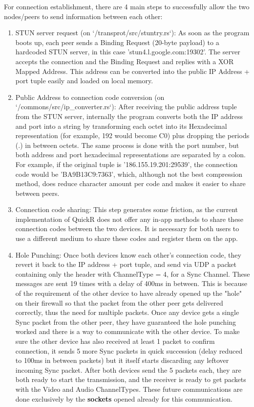 \documentclass{article}
\begin{document}
For connection establishment, there are 4 main steps to successfully allow the two nodes/peers to send information between each other:
\begin{enumerate}
    \item STUN server request (on \colorbox{gray!20}{`/transprot/src/stuntry.rs`}): As soon as the program boots up, each peer sends a Binding Request (20-byte payload) to a hardcoded STUN server, in this case
    \newline 'stun4.l.google.com:19302'. The server accepts the connection and the Binding Request and replies with a XOR Mapped Address. This address can be converted into the public IP Address + port tuple easily and loaded on local memory. 
    \item Public Address to connection code conversion (on \colorbox{gray!20}{`/commons/src/ip\_converter.rs`}): After receiving the public address tuple from the STUN server, internally the program converts both the IP address and port into a string by transforming each octet into its Hexadecimal representation (for example, 192 would become C0) plus dropping the periods (.) in between octets. The same process is done with the 
    port number, but both address and port hexadecimal representations are separated by a colon. For example, if the original tuple is '186.155.19.201:29539', the connection code would be 'BA9B13C9:7363', which, although not the best compression method, does reduce character amount per code and makes it easier to share between peers. 
    \item Connection code sharing: This step generates some friction, as the current implementation of QuickR does not offer any in-app methods to share these connection codes between the two devices. It is necessary for both users to use a different medium to share these codes and register them on the app. 
    \item Hole Punching: Once both devices know each other's connection code, they revert it back to the IP address + port tuple, and send via UDP a packet containing only the header with ChannelType = 4, for a Sync Channel. These messages are sent 19 times with a delay of 400ms in between. This is because of the requirement of the other device to have already opened up the "hole" on their firewall so that the packet from the other peer gets delivered correctly, 
    thus the need for multiple packets. Once any device gets a single Sync packet from the other peer, they have guaranteed the hole punching worked and there is a way to communicate with the other device. To make sure the other device has also received at least 1 packet to confirm connection, it sends 5 more Sync packets in quick succession (delay reduced to 100ms in between packets) but it itself starts discarding any leftover incoming Sync packet. After both devices send the 5 packets each, they are both
    ready to start the transmission, and the receiver is ready to get packets with the Video and Audio ChannelTypes. These future communications are done exclusively by the \textbf{sockets} opened already for this communication.
\end{enumerate}
\end{document}

